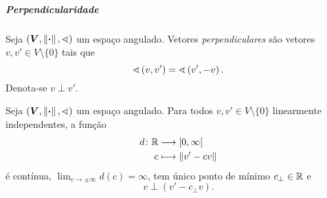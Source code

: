 \subparagraph{Perpendicularidade}


\begin{definition}
Seja $(\bm V, \left\Vert{\bm{\cdot}}\right\Vert,\sphericalangle)$ um espaço angulado. Vetores \emph{perpendiculares} são vetores $v,v' \in V \setminus \{0\}$ tais que
	\begin{equation*}
	\sphericalangle\left({v},{v'}\right) = \sphericalangle\left({v'},{-v}\right).
	\end{equation*}
Denota-se $v \perp v'$.
\end{definition}

\begin{proposition}[Perpendicular]
Seja $(\bm V, \left\Vert{\bm{\cdot}}\right\Vert,\sphericalangle)$ um espaço angulado. Para todos $v,v' \in V \setminus \{0\}$ linearmente independentes, a função
	\begin{align*}
		{d}\colon {\mathbb{R}} &\longrightarrow {\left[{0},{\infty}\right[} \\{c} &\longmapsto \left\Vert{v'-cv}\right\Vert
	\end{align*}
é contínua, $\lim_{c \to \pm\infty} d(c) = \infty$, tem único ponto de mínimo $c_{\perp} \in \mathbb{R}$ e
	\begin{equation*}
		v \perp (v'-c_{\perp}v).
	\end{equation*}
\end{proposition}
